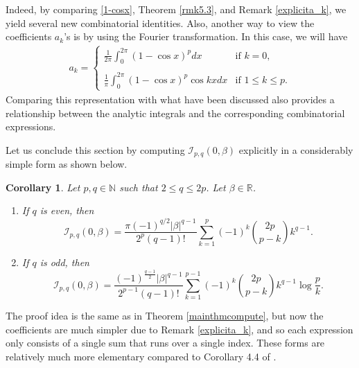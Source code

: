 \documentclass[12pt, reqno]{amsart}
\theoremstyle{plain}
\newtheorem{corollary}[theorem]{Corollary}
\theoremstyle{definition}
\begin{document}
Indeed, by comparing \eqref{1-cosx}, Theorem \ref{rmk5.3}, and Remark \ref{explicita_k}, we yield several new combinatorial identities.
    Also, another way to view the coefficients $a_k$'s is by using the Fourier transformation. In this case, we will have
    \begin{align*}
        a_k=\begin{cases}
            \displaystyle\frac{1}{2\pi}\int_0^{2\pi}(1-\cos x)^pdx &\text{if } k=0,\\
            \\
            \displaystyle\frac{1}{\pi}\int_0^{2\pi}(1-\cos x)^p\cos kxdx &\text{if } 1\le k\le p.
        \end{cases}
    \end{align*}
    Comparing this representation with what have been discussed also provides a relationship between the analytic integrals and the corresponding combinatorial expressions.


Let us conclude this section by computing $\mathcal{I}_{p, q}(0, \beta)$ explicitly in a considerably simple form as shown below.

\begin{corollary}
    Let $p, q\in\mathbb{N}$ such that $2\leq q\leq 2p$. Let $\beta\in\mathbb{R}$. 
    \begin{enumerate}
        \item [(a)] If $q$ is even, then
        \[\mathcal{I}_{p, q}(0, \beta)=\displaystyle \frac{\pi(-1)^{q/2}|\beta|^{q-1}}{2^{p}(q-1)!}\sum_{k=1}^p(-1)^k\binom{2p}{p-k}k^{q-1}.\]
        \item [(b)] If $q$ is odd, then
        \[\mathcal{I}_{p, q}(0, \beta)=\displaystyle\frac{(-1)^{\frac{q-1}{2}}|\beta|^{q-1}}{2^{p-1}(q-1)!}\sum_{k=1}^{p-1}(-1)^k\binom{2p}{p-k}k^{q-1}\log\frac{p}{k}.\]
    \end{enumerate}
\end{corollary}
The proof idea is the same as in Theorem \ref{mainthmcompute}, but now the coefficients are much simpler due to Remark \ref{explicita_k}, and so each expression only consists of a single sum that runs over a single index. These forms are relatively much more elementary compared to Corollary 4.4 of \cite{AL}.

\end{document}
